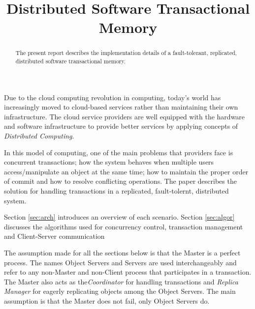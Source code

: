 \documentclass[times, 10pt,twocolumn]{article}
\begin{document}
\title{Distributed Software Transactional Memory}

\maketitle
\thispagestyle{empty}

\begin{abstract}
   The present report describes the implementation details of a fault-tolerant,
   replicated, distributed software transactional memory.
\end{abstract}

Due to the cloud computing revolution in computing, 
today’s world has increasingly moved to cloud-based services rather than maintaining their 
own infrastructure. The cloud service providers are well equipped with the hardware and
 software infrastructure to provide better services by applying concepts of {\it Distributed Computing}. 

In this model of computing, one of the main problems that providers face is concurrent transactions;
 how the system behaves when multiple users access/manipulate an object at the same time; how to maintain 
the proper order of commit and how to resolve conflicting operations. 
The paper describes the solution for handling transactions in a replicated, fault-tolernt, distributed system. 

Section \ref{sec:arch} introduces an overview of each scenario. Section 
\ref{sec:algor} discusses the algorithms used for concurrency control, 
transaction management and Client-Server communication


\label{sec:arch}

The assumption made for all the sections below is that the Master is a perfect process. 
The names Object Servers and Servers are used interchangeably and refer to any non-Master and non-Client process
 that participates in a transaction.
The Master also acts as the{\it Coordinator} for handling transactions and {\it Replica Manager} for eagerly replicating
objects among the Object Servers. The main assumption is that the Master does not fail, only Object Servers do.
\end{document}
